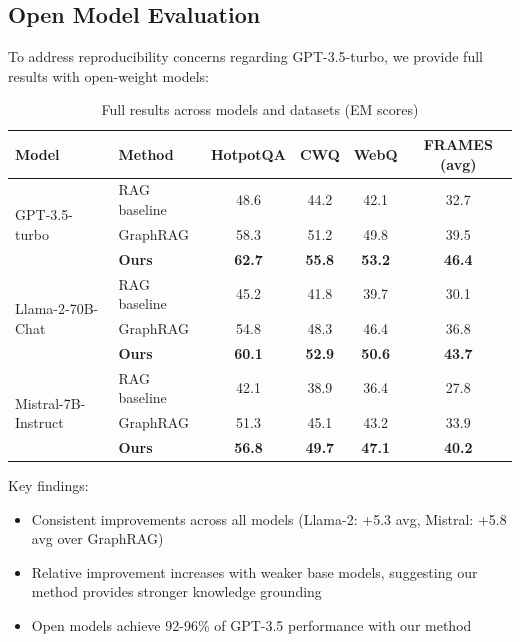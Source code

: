 \documentclass[10pt,twocolumn]{article}
\begin{document}

\subsection{Open Model Evaluation}
\label{sec:open_models}

To address reproducibility concerns regarding GPT-3.5-turbo, we provide full results with open-weight models:

\begin{table}[t]
\centering
\caption{Full results across models and datasets (EM scores)}
\label{tab:open_models}
\small
\begin{tabular}{@{}llcccc@{}}
\toprule
\textbf{Model} & \textbf{Method} & \textbf{HotpotQA} & \textbf{CWQ} & \textbf{WebQ} & \textbf{FRAMES (avg)} \\
\midrule
\multirow{3}{*}{GPT-3.5-turbo} & RAG baseline & 48.6 & 44.2 & 42.1 & 32.7 \\
& GraphRAG & 58.3 & 51.2 & 49.8 & 39.5 \\
& \textbf{Ours} & \textbf{62.7} & \textbf{55.8} & \textbf{53.2} & \textbf{46.4} \\
\midrule
\multirow{3}{*}{Llama-2-70B-Chat} & RAG baseline & 45.2 & 41.8 & 39.7 & 30.1 \\
& GraphRAG & 54.8 & 48.3 & 46.4 & 36.8 \\
& \textbf{Ours} & \textbf{60.1} & \textbf{52.9} & \textbf{50.6} & \textbf{43.7} \\
\midrule
\multirow{3}{*}{Mistral-7B-Instruct} & RAG baseline & 42.1 & 38.9 & 36.4 & 27.8 \\
& GraphRAG & 51.3 & 45.1 & 43.2 & 33.9 \\
& \textbf{Ours} & \textbf{56.8} & \textbf{49.7} & \textbf{47.1} & \textbf{40.2} \\
\bottomrule
\end{tabular}
\end{table}

Key findings:
\begin{itemize}
    \item Consistent improvements across all models (Llama-2: +5.3 avg, Mistral: +5.8 avg over GraphRAG)
    \item Relative improvement increases with weaker base models, suggesting our method provides stronger knowledge grounding
    \item Open models achieve 92-96\% of GPT-3.5 performance with our method
\end{itemize}
\end{document}
